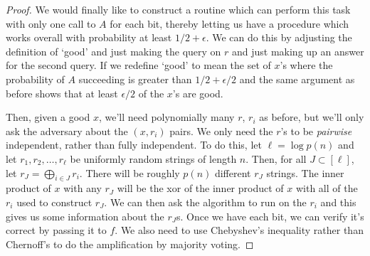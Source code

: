 \begin{proof}
We would finally like to construct a routine which can perform this task with only one call to $A$ for each bit, thereby letting us have a procedure which works overall with probability at least $1/2+\epsilon$.  We can do this by adjusting the definition of `good' and just making the query on $r$ and just making up an answer for the second query.  If we redefine `good' to mean the set of $x$'s where the probability of $A$ succeeding is greater than $1/2+\epsilon/2$ and the same argument as before shows that at least $\epsilon/2$ of the $x$'s are good.

Then, given a good $x$, we'll need polynomially many $r$, $r_i$ as before, but we'll only ask the adversary about the $(x,r_i)$ pairs.  We only need the $r$'s to be \textit{pairwise} independent, rather than fully independent.  To do this, let $\ell =\log{p(n)}$ and let $r_1,r_2,\dots,r_\ell$ be uniformly random strings of length $n$.  Then, for all $J\subset[\ell]$, let $r_J = \bigoplus_{i\in J} r_i$.  There will be roughly $p(n)$ different $r_J$ strings.  The inner product of $x$ with any $r_J$ will be the xor of the inner product of $x$ with all of the $r_i$ used to construct $r_J$.  We can then ask the algorithm to run on the $r_i$ and this gives us some information about the $r_J$s.  Once we have each bit, we can verify it's correct by passing it to $f$.  We also need to use Chebyshev's inequality rather than Chernoff's to do the amplification by majority voting.  


\end{proof}



